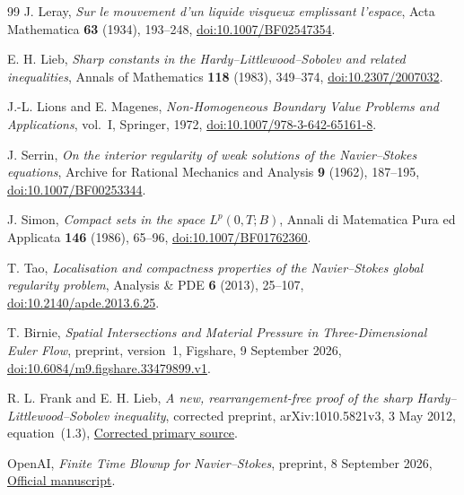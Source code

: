 \begin{thebibliography}{99}
J. Leray,
\emph{Sur le mouvement d'un liquide visqueux emplissant l'espace},
Acta Mathematica \textbf{63} (1934), 193--248,
\href{https://doi.org/10.1007/BF02547354}{doi:10.1007/BF02547354}.

E. H. Lieb,
\emph{Sharp constants in the Hardy--Littlewood--Sobolev and related
inequalities},
Annals of Mathematics \textbf{118} (1983), 349--374,
\href{https://doi.org/10.2307/2007032}{doi:10.2307/2007032}.

J.-L. Lions and E. Magenes,
\emph{Non-Homogeneous Boundary Value Problems and Applications}, vol.~I,
Springer, 1972,
\href{https://doi.org/10.1007/978-3-642-65161-8}{doi:10.1007/978-3-642-65161-8}.

J. Serrin,
\emph{On the interior regularity of weak solutions of the Navier--Stokes
equations},
Archive for Rational Mechanics and Analysis \textbf{9} (1962), 187--195,
\href{https://doi.org/10.1007/BF00253344}{doi:10.1007/BF00253344}.

J. Simon,
\emph{Compact sets in the space \(L^p(0,T;B)\)},
Annali di Matematica Pura ed Applicata \textbf{146} (1986), 65--96,
\href{https://doi.org/10.1007/BF01762360}{doi:10.1007/BF01762360}.

T. Tao,
\emph{Localisation and compactness properties of the Navier--Stokes global
regularity problem},
Analysis \& PDE \textbf{6} (2013), 25--107,
\href{https://doi.org/10.2140/apde.2013.6.25}{doi:10.2140/apde.2013.6.25}.

T. Birnie,
\emph{Spatial Intersections and Material Pressure in Three-Dimensional Euler
Flow}, preprint, version~1, Figshare, 9 September 2026,
\href{https://doi.org/10.6084/m9.figshare.33479899.v1}{doi:10.6084/m9.figshare.33479899.v1}.

R. L. Frank and E. H. Lieb,
\emph{A new, rearrangement-free proof of the sharp Hardy--Littlewood--Sobolev
inequality}, corrected preprint, arXiv:1010.5821v3, 3 May 2012, equation~(1.3),
\href{https://arxiv.org/pdf/1010.5821v3}{Corrected primary source}.

OpenAI,
\emph{Finite Time Blowup for Navier--Stokes}, preprint, 8 September 2026,
\href{https://cdn.openai.com/pdf/32d9f210-8b73-45e0-91bc-82a30aef8a9a/navier-stokes.pdf}{Official manuscript}.

\end{thebibliography}

